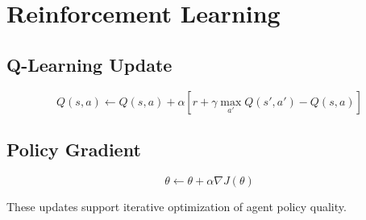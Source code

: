\section*{Reinforcement Learning}

\subsection*{Q-Learning Update}
\[
Q(s,a)\leftarrow Q(s,a)+\alpha\left[r+\gamma\max_{a'}Q(s',a')-Q(s,a)\right]
\]

\subsection*{Policy Gradient}
\[
\theta\leftarrow \theta + \alpha\nabla J(\theta)
\]

These updates support iterative optimization of agent policy quality.
